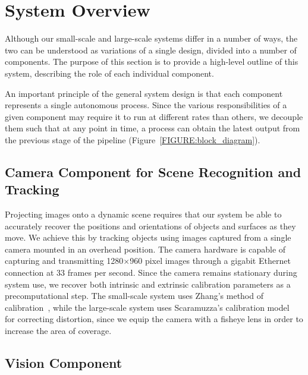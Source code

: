\documentclass{thesis}
\begin{document}
\section{System Overview}

Although our small-scale and large-scale systems differ in a number of ways, the two can be understood as variations of a single design, divided into a number of components. The purpose of this section is to provide a high-level outline of this system, describing the role of each individual component.

An important principle of the general system design is that each component represents a single autonomous process. Since the various responsibilities of a given component may require it to run at different rates than others, we decouple them such that at any point in time, a process can obtain the latest output from the previous stage of the pipeline (Figure~\ref{FIGURE:block_diagram}). 

\subsection{Camera Component for Scene Recognition and Tracking}

Projecting images onto a dynamic scene requires that our system be able to accurately recover the positions and orientations of objects and surfaces as they move. We achieve this by tracking objects using images captured from a single camera mounted in an overhead position. The camera hardware is capable of capturing and transmitting 1280\begin{math}\times\end{math}960 pixel images through a gigabit Ethernet connection at 33 frames per second. Since the camera remains stationary during system use, we recover both intrinsic and extrinsic calibration parameters as a precomputational step. The small-scale system uses Zhang's method of calibration~\cite{Zhang2000}, while the large-scale system uses Scaramuzza's calibration model~\cite{Scaramuzza2006} for correcting distortion, since we equip the camera with a fisheye lens in order to increase the area of coverage.

\subsection{Vision Component }
\end{document}
